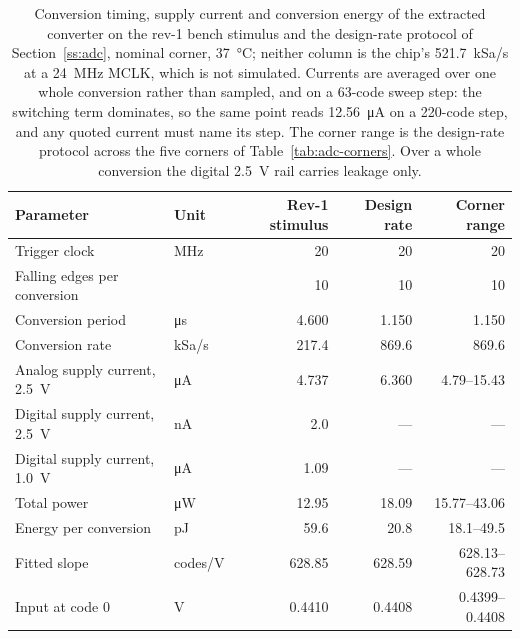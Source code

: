 \begin{table}[htbp]
  \centering
  \caption[{Conversion timing, supply current and conversion energy on the rev-1 bench stimulus and the design-rate clock protocol.}]{Conversion timing, supply current and conversion energy of the extracted converter on the rev-1 bench stimulus and the design-rate protocol of Section~\ref{ss:adc}, nominal corner, \SI{37}{\celsius}; neither column is the chip's \SI{521.7}{kSa/s} at a \SI{24}{\mega\hertz} MCLK, which is not simulated. Currents are averaged over one whole conversion rather than sampled, and on a 63-code sweep step: the switching term dominates, so the same point reads \SI{12.56}{\micro\ampere} on a 220-code step, and any quoted current must name its step. The corner range is the design-rate protocol across the five corners of Table~\ref{tab:adc-corners}. Over a whole conversion the digital \SI{2.5}{\volt} rail carries leakage only.}
  \label{tab:adc-power}
  \begin{tabular}{llrrr}
    \toprule
    Parameter & Unit & Rev-1 stimulus & Design rate & Corner range \\
    \midrule
    Trigger clock                & \si{\mega\hertz}   & 20 & 20 & 20 \\
    Falling edges per conversion &                    & 10 & 10 & 10 \\
    Conversion period            & \si{\micro\second} & 4.600 & 1.150 & 1.150 \\
    Conversion rate              & kSa/s              & 217.4 & 869.6 & 869.6 \\
    \midrule
    Analog supply current, \SI{2.5}{\volt}  & \si{\micro\ampere} & 4.737 & 6.360 & 4.79--15.43 \\
    Digital supply current, \SI{2.5}{\volt} & \si{\nano\ampere}  & 2.0 & --- & --- \\
    Digital supply current, \SI{1.0}{\volt} & \si{\micro\ampere} & 1.09 & --- & --- \\
    Total power                             & \si{\micro\watt}   & 12.95 & 18.09 & 15.77--43.06 \\
    Energy per conversion                   & \si{\pico\joule}   & 59.6 & 20.8 & 18.1--49.5 \\
    \midrule
    Fitted slope                            & codes/V    & 628.85 & 628.59 & 628.13--628.73 \\
    Input at code 0                         & \si{\volt} & 0.4410 & 0.4408 & 0.4399--0.4408 \\
    \bottomrule
  \end{tabular}
\end{table}
